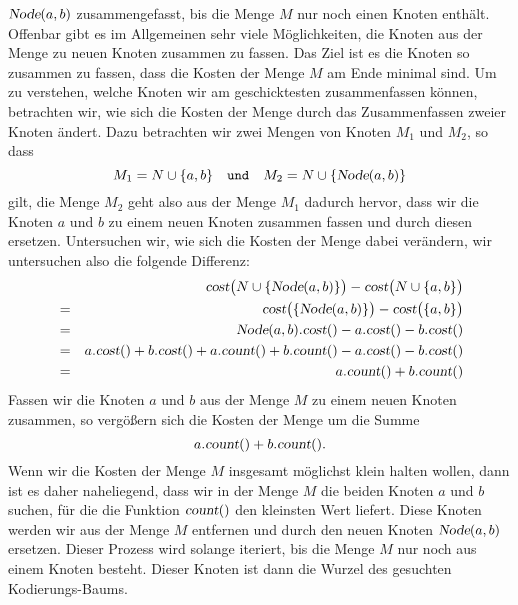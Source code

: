 $\textsl{Node}(a,b)$ zusammengefasst, bis die Menge $M$ nur noch einen Knoten enth\"alt.
Offenbar gibt es im Allgemeinen sehr viele M\"oglichkeiten, die Knoten aus der Menge zu
neuen Knoten zusammen zu fassen.  Das Ziel ist es die Knoten so zusammen zu fassen, dass
die Kosten der Menge $M$ am Ende  minimal sind.
Um zu verstehen, welche Knoten wir am geschicktesten zusammenfassen k\"onnen, betrachten wir, wie
sich die Kosten der Menge durch das Zusammenfassen zweier Knoten \"andert.
Dazu betrachten wir zwei Mengen von Knoten $M_1$ und $M_2$, so dass 
\[ M_1 = N \cup \{ a, b\} \quad \mathtt{und} \quad M_2 = N \cup \{ \textsl{Node}(a,b) \} \]
gilt, die Menge $M_2$ geht also aus der Menge $M_1$ dadurch hervor, dass wir
die Knoten $a$ und $b$ zu einem neuen Knoten zusammen fassen und durch diesen ersetzen.
Untersuchen wir, wie
sich die Kosten der Menge dabei ver\"andern, wir untersuchen also die folgende Differenz:
\begin{eqnarray*}
& & \textsl{cost}\bigl(N \cup \{ \textsl{Node}(a,b) \}\bigr) - \textsl{cost}\bigl(N \cup \{ a,b \}\bigr) \\
&=& \textsl{cost}\bigl( \{ \textsl{Node}(a,b) \}\bigr) - \textsl{cost}\bigl(\{ a,b \}\bigr)              \\
&=& \textsl{Node}(a,b).\textsl{cost}() - a.\textsl{cost}() - b.\textsl{cost}()                           \\
&=&   a.\textsl{cost}() + b.\textsl{cost}() + a.\textsl{count}() + b.\textsl{count}() 
    - a.\textsl{cost}() - b.\textsl{cost}()                                                              \\
&=& a.\textsl{count}() + b.\textsl{count}() 
\end{eqnarray*}
Fassen wir die Knoten $a$ und $b$ aus der Menge $M$ zu einem neuen Knoten zusammen, so verg\"o{\ss}ern sich
die Kosten der Menge um die Summe
\[ a.\textsl{count}() + b.\textsl{count}(). \]
Wenn wir die Kosten der Menge $M$ insgesamt m\"oglichst klein halten wollen, dann ist es daher naheliegend,
dass wir in der Menge $M$ die beiden Knoten $a$ und $b$ suchen, f\"ur die die Funktion
$\textsl{count}()$ den kleinsten Wert liefert.  Diese Knoten werden wir aus der Menge $M$
entfernen und durch den neuen Knoten $\textsl{Node}(a,b)$ ersetzen.
Dieser Prozess wird solange iteriert, bis die Menge $M$ nur noch aus einem Knoten besteht.  Dieser
Knoten ist dann die Wurzel des gesuchten Kodierungs-Baums. 


